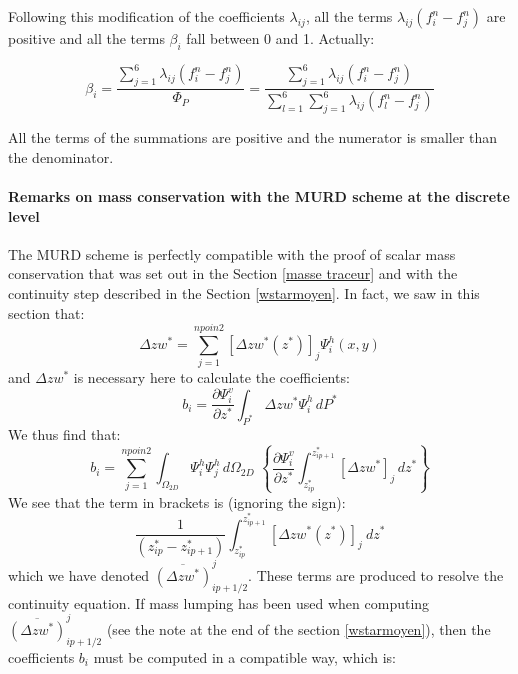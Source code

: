 Following this modification of the coefficients $\lambda_{ij}$, all the terms
$\lambda_{ij}(f_{i}^{n}-f_{j}^{n})$ are positive and all the terms $\beta_{i}$
fall between 0 and 1. Actually:%

\begin{equation}
\beta_{i}=\dfrac{\sum\limits_{j=1}^{6}\lambda_{ij}(f_{i}^{n}-f_{j}^{n})}%
{\Phi_{P}}=\dfrac{\sum\limits_{j=1}^{6}\lambda_{ij}(f_{i}^{n}-f_{j}^{n})}%
{\sum\limits_{l=1}^{6}\sum\limits_{j=1}^{6}\lambda_{ij}(f_{l}^{n}-f_{j}^{n})}%
\end{equation}


All the terms of the summations are positive and the numerator is smaller than
the denominator.

\paragraph{\label{murdconservation}Remarks on mass conservation with the
MURD scheme at the discrete level}

The MURD scheme is perfectly compatible with the proof of scalar mass
conservation that was set out in the Section \ref{masse traceur} and with the continuity
step described in the Section \ref{wstarmoyen}. In fact, we saw in this
section that:%
\begin{equation}
\Delta zw^{\ast}=\sum\limits_{j=1}^{npoin2}\left[  \Delta zw^{\ast}(z^{\ast
})\right]  _{j}\Psi_{i}^{h}(x,y)
\end{equation}
and $\Delta zw^{\ast}$ is necessary here to calculate the coefficients:%
\begin{equation}
b_{i}=\dfrac{\partial\Psi_{i}^{v}}{\partial z^{\ast}}\int\nolimits_{P^{\ast}%
}\Delta zw^{\ast}\Psi_{i}^{h}\,dP^{\ast}%
\end{equation}
We thus find that:%
\begin{equation}
b_{i}=\sum\limits_{j=1}^{npoin2}\int\nolimits_{\Omega_{2D}}\Psi_{i}^{h}%
\Psi_{j}^{h}\,d\Omega_{2D}\,\,\left\{  \dfrac{\partial\Psi_{i}^{v}}{\partial
z^{\ast}}\int\nolimits_{z_{ip}^{\ast}}^{z_{ip+1}^{\ast}}\left[  \Delta
zw^{\ast}\right]  _{j}\,dz^{\ast}\right\}
\end{equation}
We see that the term in brackets is (ignoring the sign):%
\begin{equation}
\dfrac{1}{(z_{ip}^{\ast}-z_{ip+1}^{\ast})}\int\nolimits_{z_{ip}^{\ast}%
}^{z_{ip+1}^{\ast}}\left[  \Delta zw^{\ast}(z^{\ast})\right]  _{j}~dz^{\ast}%
\end{equation}
which we have denoted $\overline{\left(  \Delta zw^{\ast}\right)}_{ip+1/2}^{j}$.
These terms are produced to resolve the continuity equation.
If mass lumping has been used when computing $\overline{\left(\Delta zw^{\ast}\right)}_{ip+1/2}^{j}$
(see the note at the end of the section \ref{wstarmoyen}), then the coefficients $b_{i}$ must be computed in a
compatible way, which is:%


